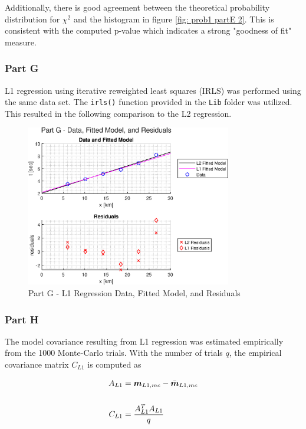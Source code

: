 Additionally, there is good agreement between the theoretical probability distribution for $\chi^2$ and the histogram in figure \ref{fig: prob1 partE 2}. This is consistent with the computed p-value which indicates a strong "goodness of fit" measure.


\subsubsection{Part G}

L1 regression using iterative reweighted least squares (IRLS) was performed using the same data set. The \verb|irls()| function provided in the \verb|Lib| folder was utilized. This resulted in the following comparison to the L2 regression. 

\begin{figure}[h] 
	\centering
	\includegraphics[width=0.8\textwidth]{./images/prob1_partG.eps}
	\caption{Part G - L1 Regression Data, Fitted Model, and Residuals}
	\label{fig: prob1 partG}
\end{figure}
\FloatBarrier


\subsubsection{Part H}

The model covariance resulting from L1 regression was estimated empirically from the 1000 Monte-Carlo trials. With the number of trials $q$, the empirical covariance matrix $C_{L1}$ is computed as

\begin{align*}
	A_{L1} &= \boldsymbol{m}_{L1,mc} - \bar{\boldsymbol{m}}_{L1,mc} \\
	\\
	C_{L1} &= \frac{A_{L1}^T A_{L1}}{q}
\end{align*}


